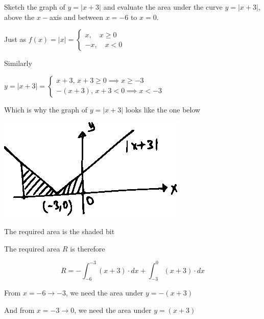 \documentclass[14pt,fleqn]{extarticle}
\begin{document}
\newcommand\inta{\int_{-6}^{-3}}
\newcommand\intb{\int_{-3}^0}
\newcommand\fx{\left(\frac{x^2}{2} + 3x\right)}

Sketch the graph of $y=\vert x + 3\vert$ and evaluate
the area under the curve $y=\vert x+3\vert$, above 
the $x-$axis and between $x=-6$ to $x=0$.
%

\newcard

Just as 
\small$ f(x) = \vert x\vert = \begin{cases} 
x,\quad x\geq 0 \\
-x,\quad x < 0 
\end{cases} $\normalsize \newline 

Similarly 

\small$y = \vert x+3\vert = \begin{cases}
x+3,\, x+3 \geq 0 \implies x \geq -3 \\
-\left(x+3 \right),\, x+3 < 0 \implies x < -3 
\end{cases}$ \normalsize\newline 

Which is why the graph of $y=\vert x+3\vert$ looks like the one below 

\begin{center}
\includegraphics[scale=1.6]{modx.eps} 
\end{center} 

The required area is the shaded bit 

\newcard 

The required area $R$ is therefore 

\[ R = -\inta \left(x+3 \right)\cdot dx + \intb \left(x+3 \right)\cdot dx \]

\newcard 

From $x=-6\rightarrow -3$, we need the area under $y = - \left(x+3 \right)$\newline 

And from $x=-3\rightarrow 0$, we need the area under $y = \left(x+3 \right)$\newline 
\end{document}

